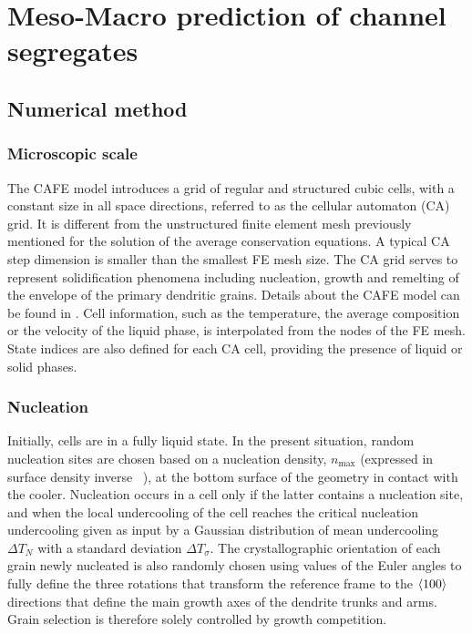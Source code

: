 \section{Meso-Macro prediction of channel segregates}

\subsection{Numerical method}

\subsubsection{Microscopic scale}

The CAFE model introduces a grid of regular and structured cubic cells, with a constant size 
in all space directions, referred to as the cellular automaton (CA) grid. It is different from 
the unstructured finite element mesh previously mentioned for the solution of the average conservation 
equations. A typical CA step dimension is smaller than the smallest FE mesh size. The CA grid serves to 
represent solidification phenomena including nucleation, growth and remelting of the envelope of the 
primary dendritic grains. 
Details about the CAFE model can be found in \citep{carozzani_3d_2012,carozzani_direct_2013,carozzani_optimized_2014}. 
Cell information, such as the temperature, the average composition or the velocity of the liquid phase, is interpolated from 
the nodes of the FE mesh. State indices are also defined for each CA cell, providing the presence of liquid or solid phases. 

\subsubsection{Nucleation}

Initially, cells are in a fully liquid state. In the present situation, random nucleation sites are 
chosen based on a nucleation density, $n_\text{max}$ (expressed in surface density inverse \si{\per \uarea}), at the 
bottom surface of the geometry in contact with the cooler. Nucleation occurs in a cell only if the 
latter contains a nucleation site, and when the local undercooling of the cell reaches the critical 
nucleation undercooling given as input by a Gaussian distribution of mean undercooling $\Delta T_N$ with a 
standard deviation $\Delta T_\sigma$. The crystallographic orientation of each grain newly nucleated is also randomly 
chosen using values of the Euler angles to fully define the three rotations that transform the reference 
frame to the $\langle 100 \rangle$ directions that define the main growth axes of the dendrite trunks and arms. Grain 
selection is therefore solely controlled by growth competition.

